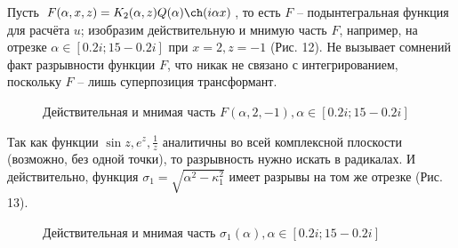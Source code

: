 \documentclass[a4paper, 12pt]{article}
\begin{document}
Пусть $F(\alpha,x,z)=K_2(\alpha,z)Q(\alpha)\ch(i\alpha x)$, то есть $F$ -- подынтегральная функция для расчёта $u$; изобразим действительную и мнимую часть $F$, например, на отрезке $\alpha \in [0.2i;15-0.2i]$ при $x=2, z=-1$ (Рис. 12). Не вызывает сомнений факт разрывности функции $F$, что никак не связано с интегрированием, поскольку $F$ -- лишь суперпозиция трансформант. 
\begin{figure}[h!]
\noindent{}
\caption{Действительная и мнимая часть $F(\alpha,2,-1), \alpha \in [0.2i;15-0.2i]$}
\label{figCurves}
\end{figure}

Так как функции $\sin z, e^z, \frac{1}{z}$ аналитичны во всей комплексной плоскости (возможно, без одной точки), то разрывность нужно искать в радикалах. И действительно, функция $\sigma_1=\sqrt{\alpha^2-\kappa^2_1}$ имеет разрывы на том же отрезке (Рис. 13).
\begin{figure}[h!]
\noindent{}
\caption{Действительная и мнимая часть $\sigma_1 (\alpha), \alpha \in [0.2i;15-0.2i]$}
\label{figCurves}
\end{figure}
\end{document}
